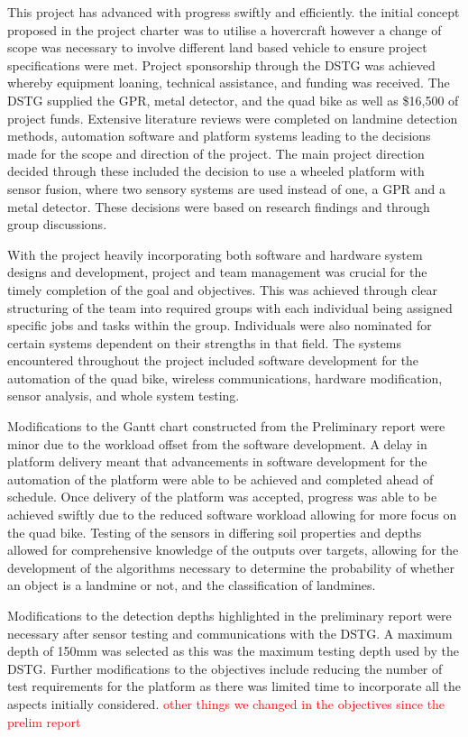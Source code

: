\documentclass[main.tex]{subfiles}
\begin{document}
This project has advanced with progress swiftly and efficiently. the initial concept proposed in the project charter was to utilise a hovercraft however a change of scope was necessary to involve different land based vehicle to ensure project specifications were met. Project sponsorship through the DSTG was achieved whereby equipment loaning, technical assistance, and funding was received. The DSTG supplied the GPR, metal detector, and the quad bike as well as \$16,500 of project funds. Extensive literature reviews were completed on landmine detection methods, automation software and platform systems leading to the decisions made for the scope and direction of the project. The main project direction decided through these included the decision to use a wheeled platform with sensor fusion, where two sensory systems are used instead of one, a GPR and a metal detector. These decisions were based on research findings and through group discussions. 

With the project heavily incorporating both software and hardware system designs and development, project and team management was crucial for the timely completion of the goal and objectives. This was achieved through clear structuring of the team into required groups with each individual being assigned specific jobs and tasks within the group. Individuals were also nominated for certain systems dependent on their strengths in that field. The systems encountered throughout the project included software development for the automation of the quad bike, wireless communications, hardware modification, sensor analysis, and whole system testing.

Modifications to the Gantt chart constructed from the Preliminary report were minor due to the workload offset from the software development. A delay in platform delivery meant that advancements in software development for the automation of the platform were able to be achieved and completed ahead of schedule. Once delivery of the platform was accepted, progress was able to be achieved swiftly due to the reduced software workload allowing for more focus on the quad bike. Testing of the sensors in differing soil properties and depths allowed for comprehensive knowledge of the outputs over targets, allowing for the development of the algorithms necessary to determine the probability of whether an object is a landmine or not, and the classification of landmines.


Modifications to the detection depths highlighted in the preliminary report were necessary after sensor testing and communications with the DSTG. A maximum depth of 150mm was selected as this was the maximum testing depth used by the DSTG. Further modifications to the objectives include reducing the number of test requirements for the platform as there was limited time to incorporate all the aspects initially considered.  \textcolor{red}{other things we changed in the objectives since the prelim report}
\end{document}
